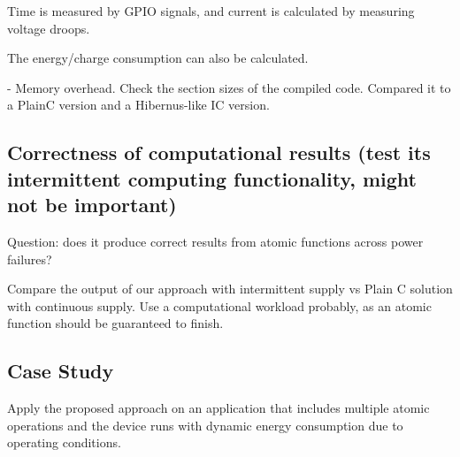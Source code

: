Time is measured by GPIO signals, and current is calculated by measuring voltage droops. 

The energy/charge consumption can also be calculated. 

- Memory overhead. Check the section sizes of the compiled code. Compared it to a PlainC version and a Hibernus-like IC version.  

\subsection{Correctness of computational results (test its intermittent computing functionality, might not be important)}

Question: does it produce correct results from atomic functions across power failures?

Compare the output of our approach with intermittent supply vs Plain C solution with continuous supply. Use a computational workload probably, as an atomic function should be guaranteed to finish. 


\subsection{Case Study}

Apply the proposed approach on an application that includes multiple atomic operations and the device runs with dynamic energy consumption due to operating conditions. 

